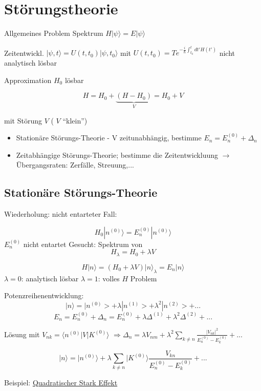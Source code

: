 




\tableofcontents
\setcounter{chapter}{2}
\chapter{Störungstheorie}


Allgemeines Problem Spektrum \(H|\psi\rangle=E|\psi\rangle\)

Zeitentwickl. \(|\psi,t\rangle = U(t,t_0)|\psi,t_0\rangle\) mit \(U(t,t_0)=T e^{-\frac i \hbar \int^t_{t_0}dt'H(t')}\) nicht analytisch lösbar

Approximation \(H_0\) lösbar

\[H = H_0 + \underbrace{(H-H_0)}_{V} = H_0 + V \]

mit Störung \(V\) ( \(V\) ``klein'')

\begin{itemize}
\item Stationäre Störungs-Theorie - V zeitunabhängig, bestimme \(E_n=E^{(0)}_n+\Delta_n\)
\item Zeitabhängige Störungs-Theorie; bestimme die Zeitentwickluung \(\rightarrow\) Übergangsraten: Zerfälle, Streuung,...
\end{itemize}

\section{Stationäre Störungs-Theorie}
Wiederholung: nicht entarteter Fall:

\[ H_0|n^{(0)}\rangle = E^{(0)}_n|n^{(0)}\rangle \]
\(E^{(0)}_n\) nicht entartet Gesucht: Spektrum von
\[ H_\lambda = H_0+\lambda V\]

\[ H|n\rangle = (H_0 + \lambda V)|n\rangle_\lambda = E_n|n\rangle \]
\(\lambda = 0\): analytisch lösbar \(\lambda = 1\): volles \(H\) Problem

Potenzreihenentwicklung:
\[ |n\rangle = |n^{(0)}>+\lambda|n^{(1)}>+\lambda^2|n^{(2)}>+...\]
\[ E_n= E^{(0)}_n + \Delta_n = E^{(0)}_n +
\lambda\Delta^{(1)}+\lambda^2\Delta^{(2)}+...\]

Lösung mit \(V_{nk}=\langle n^{(0)}|V|K^{(0)}\rangle\) \(\Rightarrow \Delta_n = \lambda V_{nm} + \lambda^2\sum_{k\neq n}\frac{|V_{nk}|^2}{E^{(0)}_n-E^{(0)}_k}+...\)

\[ |n\rangle = |n^{(0)}\rangle + \lambda \sum_{k\neq
  n}|K^{(0)}\rangle \frac{V_{kn}}{E^{(0)}_n-E^{(0)}_k}+...\]

Beispiel: \underline{Quadratischer Stark Effekt}

